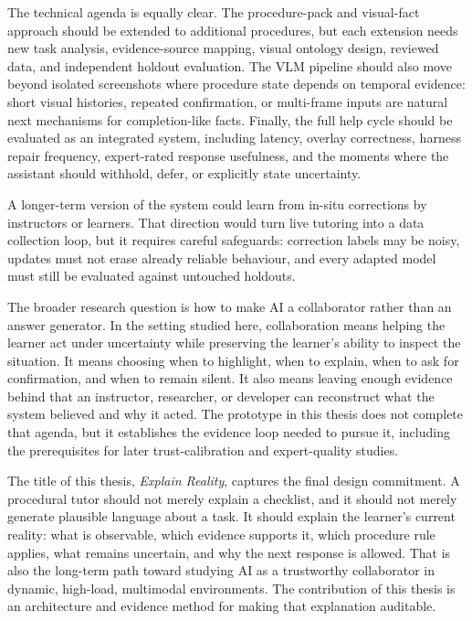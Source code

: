 The technical agenda is equally clear. The procedure-pack and visual-fact
approach should be extended to additional procedures, but each extension needs
new task analysis, evidence-source mapping, visual ontology design, reviewed
data, and independent holdout evaluation. The VLM pipeline should also move
beyond isolated screenshots where procedure state depends on temporal evidence:
short visual histories, repeated confirmation, or multi-frame inputs are natural
next mechanisms for completion-like facts. Finally, the full help cycle should
be evaluated as an integrated system, including latency, overlay correctness,
harness repair frequency, expert-rated response usefulness, and the moments
where the assistant should withhold, defer, or explicitly state uncertainty.

A longer-term version of the system could learn from in-situ corrections by
instructors or learners. That direction would turn live tutoring into a data
collection loop, but it requires careful safeguards: correction labels may be
noisy, updates must not erase already reliable behaviour, and every adapted
model must still be evaluated against untouched holdouts.

The broader research question is how to make AI a collaborator rather than an
answer generator. In the setting studied here, collaboration means helping the
learner act under uncertainty while preserving the learner's ability to inspect
the situation. It means choosing when to highlight, when to explain, when to ask
for confirmation, and when to remain silent. It also means leaving enough
evidence behind that an instructor, researcher, or developer can reconstruct
what the system believed and why it acted. The prototype in this thesis does
not complete that agenda, but it establishes the evidence loop needed to pursue
it, including the prerequisites for later trust-calibration and expert-quality
studies.

The title of this thesis, \emph{Explain Reality}, captures the final design
commitment. A procedural tutor should not merely explain a checklist, and it
should not merely generate plausible language about a task. It should explain
the learner's current reality: what is observable, which evidence supports it,
which procedure rule applies, what remains uncertain, and why the next response
is allowed. That is also the long-term path toward studying AI as a trustworthy
collaborator in dynamic, high-load, multimodal environments. The contribution
of this thesis is an architecture and evidence method for making that
explanation auditable.
